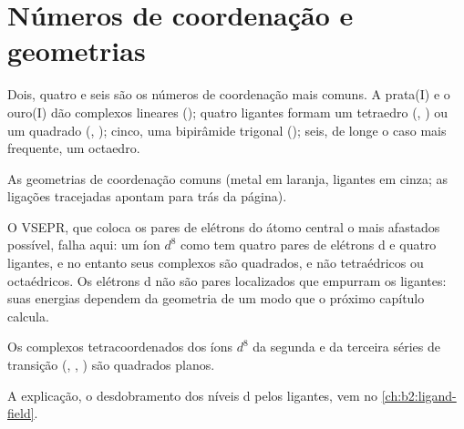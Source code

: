 \section{Números de coordenação e geometrias}

Dois, quatro e seis são os números de coordenação mais comuns. A prata(I) e o
ouro(I) dão complexos lineares (\ce{[Ag(NH3)2]+}); quatro ligantes formam um
tetraedro (, ) ou um quadrado (,
); cinco, uma bipirâmide trigonal (); seis, de longe
o caso mais frequente, um octaedro.

\begin{omfigure}

{\small As geometrias de coordenação comuns (metal em laranja, ligantes em
cinza; as ligações tracejadas apontam para trás da página).}
\end{omfigure}

O VSEPR, que coloca os pares de elétrons do átomo central o mais afastados
possível, falha aqui: um íon $d^8$ como  tem quatro pares de elétrons
d e quatro ligantes, e no entanto seus complexos são quadrados, e não
tetraédricos ou octaédricos. Os elétrons d não são pares localizados que
empurram os ligantes: suas energias dependem da geometria de um modo que o
próximo capítulo calcula.

\begin{proposition}\label{prop:b2:coordination-complexes:square-planar}
Os complexos tetracoordenados dos íons $d^8$ da segunda e da terceira séries
de transição (, , ) são quadrados planos.
\end{proposition}

\admitted

A explicação, o desdobramento dos níveis d pelos ligantes, vem no
\cref{ch:b2:ligand-field}.

